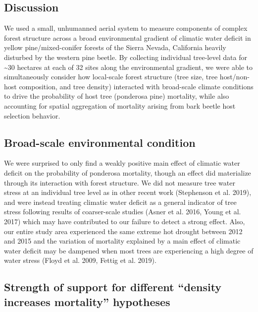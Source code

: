 \documentclass[]{article}
\begin{document}
\subsection{Discussion}\label{discussion}

We used a small, unhumanned aerial system to measure components of
complex forest structure across a broad environmental gradient of
climatic water deficit in yellow pine/mixed-conifer forests of the
Sierra Nevada, California heavily disturbed by the western pine beetle.
By collecting individual tree-level data for \textasciitilde{}30
hectares at each of 32 sites along the environmental gradient, we were
able to simultaneously consider how local-scale forest structure (tree
size, tree host/non-host composition, and tree density) interacted with
broad-scale climate conditions to drive the probability of host tree
(ponderosa pine) mortality, while also accounting for spatial
aggregation of mortality arising from bark beetle host selection
behavior.

\subsection{Broad-scale environmental
condition}\label{broad-scale-environmental-condition}

We were surprised to only find a weakly positive main effect of climatic
water deficit on the probability of ponderosa mortality, though an
effect did materialize through its interaction with forest structure. We
did not measure tree water stress at an individual tree level as in
other recent work (Stephenson et al. 2019), and were instead treating
climatic water deficit as a general indicator of tree stress following
results of coarser-scale studies (Asner et al. 2016, Young et al. 2017)
which may have contributed to our failure to detect a strong effect.
Also, our entire study area experienced the same extreme hot drought
between 2012 and 2015 and the variation of mortality explained by a main
effect of climatic water deficit may be dampened when most trees are
experiencing a high degree of water stress (Floyd et al. 2009, Fettig et
al. 2019).

\subsection{\texorpdfstring{Strength of support for different ``density
increases mortality''
hypotheses}{Strength of support for different density increases mortality hypotheses}}\label{strength-of-support-for-different-density-increases-mortality-hypotheses}
\end{document}

